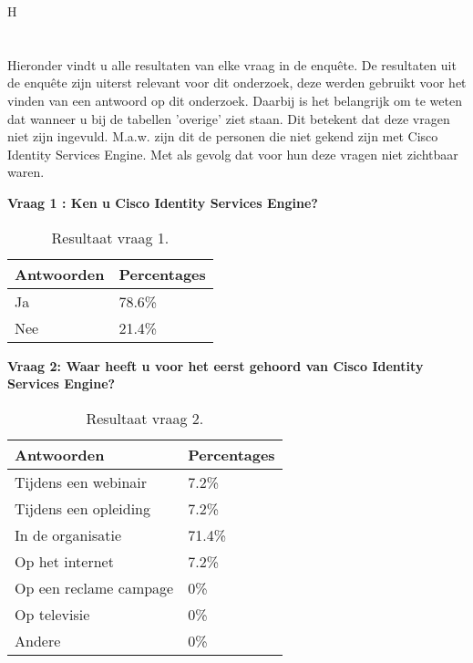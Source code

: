 H\chapter{}
\label{ch:Resultaten_enquête}

Hieronder vindt u alle resultaten van elke vraag in de enquête. De resultaten uit de enquête zijn uiterst relevant voor dit onderzoek, deze werden gebruikt voor het vinden van een antwoord op dit onderzoek. Daarbij is het belangrijk om te weten dat wanneer u bij de tabellen 'overige' ziet staan. Dit betekent dat deze vragen niet zijn ingevuld. M.a.w. zijn dit de personen die niet gekend zijn met Cisco Identity Services Engine. Met als gevolg dat voor hun deze vragen niet zichtbaar waren.
\newline

\textbf{Vraag 1 : Ken u Cisco Identity Services Engine?}
\begin{table}[h!]
\begin{center}
		\begin{tabular}{|l|l|}
			\hline
			\bf Antwoorden    & \bf Percentages \\ \hline
			Ja  & 78.6\% \\ \hline
			Nee & 21.4\% \\ \hline
		\end{tabular}
	\caption{Resultaat vraag 1.}
\end{center}
\end{table}

\newpage
\textbf{Vraag 2: Waar heeft u voor het eerst gehoord van Cisco Identity Services Engine?}
\begin{table}[H]
	\begin{center}
		\begin{tabular}{|l|l|}
			\hline
			\bf Antwoorden    & \bf Percentages \\ \hline
			Tijdens een webinair   & 7.2\%  \\ \hline
			Tijdens een opleiding  & 7.2\%  \\ \hline
			In de organisatie      & 71.4\% \\ \hline
			Op het internet        & 7.2\%  \\ \hline
			Op een reclame campage & 0\%    \\ \hline
			Op televisie           & 0\%    \\ \hline
			Andere                 & 0\%    \\ \hline
		\end{tabular}
		\caption{Resultaat vraag 2.}
	\end{center}
\end{table}

